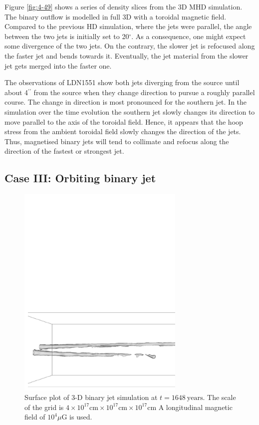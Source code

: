 Figure \ref{fig:4-49} shows a series of density slices from the 3D MHD
simulation. The binary outflow is modelled in full 3D with a toroidal magnetic field.
Compared to the previous HD simulation, where the jets were parallel, the angle between the two jets is initially set to 20$^\circ$. 
As a consequence, one might expect some divergence of the two jets.
On the contrary,
the slower jet is refocused along the faster jet and bends towards it. 
Eventually, the jet material from the slower jet gets merged into the faster one.

The observations  of LDN1551 show both jets diverging from the source 
until about 4$^{\prime\prime}$ from the source when they change 
direction to pursue a roughly parallel course. The change in direction 
is most pronounced for the southern jet.
In the simulation over the time evolution the southern jet slowly changes its
direction to move parallel to the axis of the toroidal field.
Hence, it appears that the hoop stress from the ambient toroidal field slowly 
changes the direction of the jets.
Thus, magnetised binary jets will tend to collimate and refocus
along the direction of the fastest or strongest jet. 

\subsection{Case III: Orbiting binary jet}

\begin{figure}[t]
\centering
\includegraphics[width=8cm]{3d_surface}
\caption{ 
Surface plot of 3-D binary jet simulation at $t=1648~\mathrm{years}$.
The scale of the grid is $4\times10^{17} \mathrm{cm} \times 10^{17}
 \mathrm{cm} \times 10^{17} \mathrm{cm} $
A longitudinal magnetic field of $10^4 \mu$G is used.
}
\label{fig:4-6}
\end{figure}


